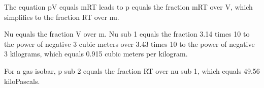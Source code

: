 The equation pV equals mRT leads to p equals the fraction mRT over V, which simplifies to the fraction RT over nu.

Nu equals the fraction V over m. Nu sub 1 equals the fraction 3.14 times 10 to the power of negative 3 cubic meters over 3.43 times 10 to the power of negative 3 kilograms, which equals 0.915 cubic meters per kilogram.

For a gas isobar, p sub 2 equals the fraction RT over nu sub 1, which equals 49.56 kiloPascals.